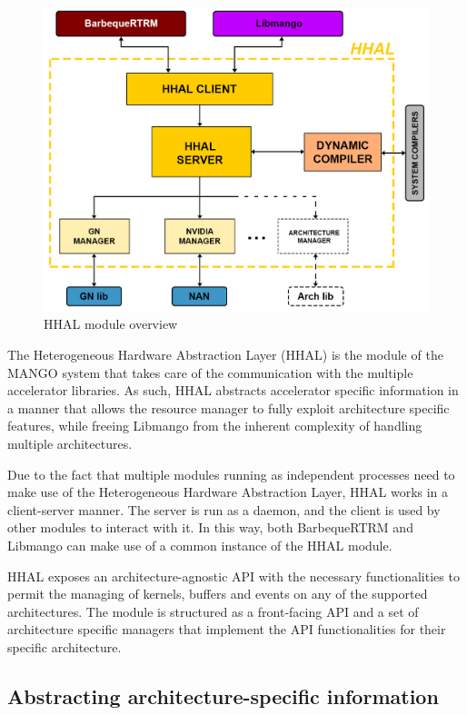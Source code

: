 \begin{figure}[ht]
    \centering
    \includegraphics[width=\textwidth]{img/hhal.png}
    \captionsetup{justification=centering}
    \caption{HHAL module overview}
    \label{fig:hhal}
\end{figure}

The Heterogeneous Hardware Abstraction Layer (HHAL) is the module of the MANGO system that takes care of the communication with the multiple accelerator libraries.
As such, HHAL abstracts accelerator specific information in a manner that allows the resource manager to fully exploit architecture specific features, while freeing Libmango from the inherent complexity of handling multiple architectures.

Due to the fact that multiple modules running as independent processes need to make use of the Heterogeneous Hardware Abstraction Layer, HHAL works in a client-server manner. The server is run as a daemon, and the client is used by other modules to interact with it. In this way, both BarbequeRTRM and Libmango can make use of a common instance of the HHAL module.

HHAL exposes an architecture-agnostic API with the necessary functionalities to permit the managing of kernels, buffers and events on any of the supported architectures. The module is structured as a front-facing API and a set of architecture specific managers that implement the API functionalities for their specific architecture.

\subsection{Abstracting architecture-specific information}

